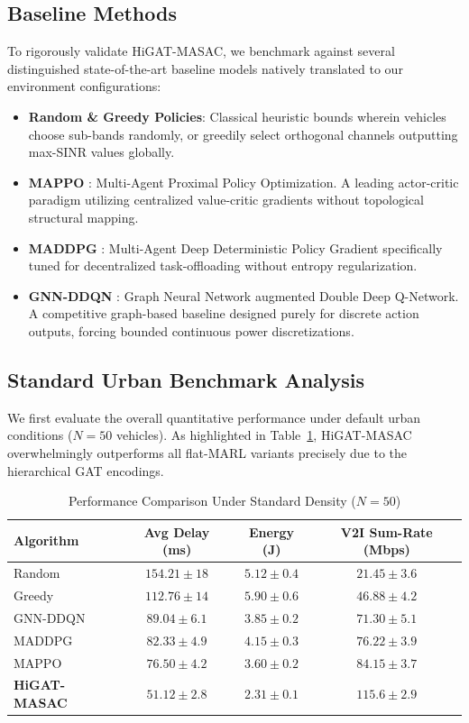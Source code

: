 \subsection{Baseline Methods}
To rigorously validate HiGAT-MASAC, we benchmark against several distinguished state-of-the-art baseline models natively translated to our environment configurations:
\begin{itemize}
    \item \textbf{Random \& Greedy Policies}: Classical heuristic bounds wherein vehicles choose sub-bands randomly, or greedily select orthogonal channels outputting max-SINR values globally.
    \item \textbf{MAPPO} \cite{wang2025marl}: Multi-Agent Proximal Policy Optimization. A leading actor-critic paradigm utilizing centralized value-critic gradients without topological structural mapping.
    \item \textbf{MADDPG} \cite{tan2025enhanced}: Multi-Agent Deep Deterministic Policy Gradient specifically tuned for decentralized task-offloading without entropy regularization.
    \item \textbf{GNN-DDQN} \cite{ji2025gnn}: Graph Neural Network augmented Double Deep Q-Network. A competitive graph-based baseline designed purely for discrete action outputs, forcing bounded continuous power discretizations. 
\end{itemize}

\subsection{Standard Urban Benchmark Analysis}
We first evaluate the overall quantitative performance under default urban conditions ($N=50$ vehicles). As highlighted in Table~\ref{tab:results}, HiGAT-MASAC overwhelmingly outperforms all flat-MARL variants precisely due to the hierarchical GAT encodings.

\begin{table}[htbp]
\centering
\caption{Performance Comparison Under Standard Density ($N=50$)}
\label{tab:results}
\begin{tabular}{lccc}
\toprule
\textbf{Algorithm} & \textbf{Avg Delay (ms)} & \textbf{Energy (J)} & \textbf{V2I Sum-Rate (Mbps)} \\
\midrule
Random         & $154.21 \pm 18$ & $5.12 \pm 0.4$ & $21.45 \pm 3.6$ \\
Greedy         & $112.76 \pm 14$ & $5.90 \pm 0.6$ & $46.88 \pm 4.2$ \\
GNN-DDQN \cite{ji2025gnn} & $89.04 \pm 6.1$  & $3.85 \pm 0.2$ & $71.30 \pm 5.1$ \\
MADDPG \cite{tan2025enhanced} & $82.33 \pm 4.9$  & $4.15 \pm 0.3$ & $76.22 \pm 3.9$ \\
MAPPO \cite{wang2025marl}  & $76.50 \pm 4.2$  & $3.60 \pm 0.2$ & $84.15 \pm 3.7$ \\
\textbf{HiGAT-MASAC} & $\mathbf{51.12} \pm \mathbf{2.8}$ & $\mathbf{2.31} \pm \mathbf{0.1}$ & $\mathbf{115.6} \pm \mathbf{2.9}$ \\
\bottomrule
\end{tabular}
\end{table}

